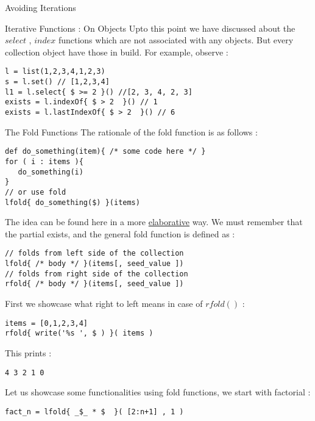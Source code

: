 \begin{section}{Avoiding Iterations}
\begin{subsection}{Iterative Functions : On Objects}
Upto this point we have discussed about the $select$ , $index$ functions
which are not associated with any objects. But every collection object 
have those in build. For example, observe :
\begin{lstlisting}[style=JexlStyle]
l = list(1,2,3,4,1,2,3)
s = l.set() // [1,2,3,4]
l1 = l.select{ $ >= 2 }() //[2, 3, 4, 2, 3] 
exists = l.indexOf{ $ > 2  }() // 1
exists = l.lastIndexOf{ $ > 2  }() // 6
\end{lstlisting}
\end{subsection}

\begin{subsection}{The Fold Functions}
The rationale of the fold function is as follows :

\begin{lstlisting}[style=JexlStyle]
def do_something(item){ /* some code here */ }
for ( i : items ){
   do_something(i)
}
// or use fold
lfold{ do_something($) }(items)
\end{lstlisting}
The idea can be found here in a more \href{https://en.wikipedia.org/wiki/Fold\_(higher-order\_function)}{elaborative} way.
We must remember that the partial exists, and the general fold function is defined as :
\begin{lstlisting}[style=JexlStyle]
// folds from left side of the collection 
lfold{ /* body */ }(items[, seed_value ])
// folds from right side of the collection 
rfold{ /* body */ }(items[, seed_value ])
\end{lstlisting}

First we showcase what right to left means in case of $rfold()$ :

\begin{lstlisting}[style=JexlStyle]
items = [0,1,2,3,4]
rfold{ write('%s ', $ ) }( items )
\end{lstlisting}
This prints :
\begin{lstlisting}[style=all]
4 3 2 1 0 
\end{lstlisting}



Let us showcase some functionalities using fold functions,
we start with factorial : 

\begin{lstlisting}[style=JexlStyle]
fact_n = lfold{ _$_ * $  }( [2:n+1] , 1 )
\end{lstlisting}


\end{subsection}
\end{section}
